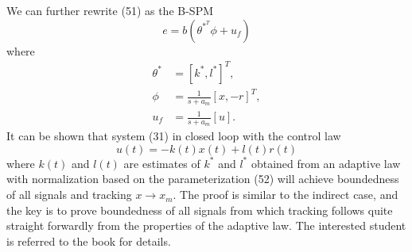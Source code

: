 \documentclass[10pt]{article}
\begin{document}
\begin{multicols*}{2}
We can further rewrite (51) as the B-SPM
$$
	e=b\left(\theta^{*^T} \phi+u_f\right)
$$
where
$$
	\begin{aligned}
		\theta^* & =\left[k^*, l^*\right]^T, \\
		\phi     & =\frac{1}{s+a_m}[x,-r]^T, \\
		u_f      & =\frac{1}{s+a_m}[u] .
	\end{aligned}
$$
It can be shown that system (31) in closed loop with the control law
$$
	u(t)=-k(t) x(t)+l(t) r(t)
$$
where $k(t)$ and $l(t)$ are estimates of $k^*$ and $l^*$ obtained from an adaptive law with normalization based on the parameterization (52) will achieve boundedness of all signals and tracking $x \rightarrow x_m$. The proof is similar to the indirect case, and the key is to prove boundedness of all signals from which tracking follows quite straight forwardly from the properties of the adaptive law. The interested student is referred to the book for details.

\end{multicols*}
\end{document}
